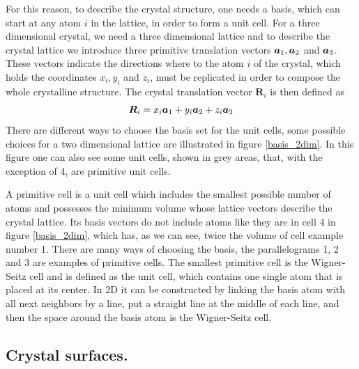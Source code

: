 	For this reason, to describe the crystal structure, one needs a basis, which can start at any atom $i$ in the lattice, in order to form a unit cell. For a three dimensional crystal, we need a three dimensional lattice and to describe the crystal lattice we introduce three primitive translation vectors $\boldsymbol{a}_1,\boldsymbol{a}_2$ and $\boldsymbol{a}_3$. These vectors indicate the directions where to the atom $i$ of the crystal, which holds the coordinates $x_i, y_i $ and $z_i$, must be replicated in order to compose the whole crystalline structure. The crystal translation vector $\boldsymbol{R}_i$ is then defined as 
	\begin{equation} \label{vector}
		\boldsymbol{R}_i = x_i \boldsymbol{a}_1 + y_i \boldsymbol{a}_2 + z_i \boldsymbol{a}_3
	\end{equation}
	There are different ways to choose the basis set for the unit cells, some possible choices for a two dimensional lattice are illustrated in figure \ref{basis_2dim}. In this figure one can also see some unit cells, shown in grey areas, that, with the exception of 4, are primitive unit cells.
	
	A primitive cell is a unit cell which includes the smallest possible number of atoms and possesses the minimum volume whose lattice vectors describe the crystal lattice.  
	Its basis vectors do not include atoms like they are in cell 4 in figure \ref{basis_2dim},
	which has, as we can see, twice the volume of cell example number 1.
	There are many ways of choosing the basis, the parallelograms 1, 2 and 3 are examples of primitive cells. 
	The smallest primitive cell is the Wigner-Seitz cell and is defined as the unit cell, which contains one single atom that is placed at its center. In 2D it can be constructed by linking the basis atom with all next neighbors by a line, put a straight line at the middle of each line, and then the space around the basis atom is the Wigner-Seitz cell. 
\subsection{Crystal surfaces.}	
